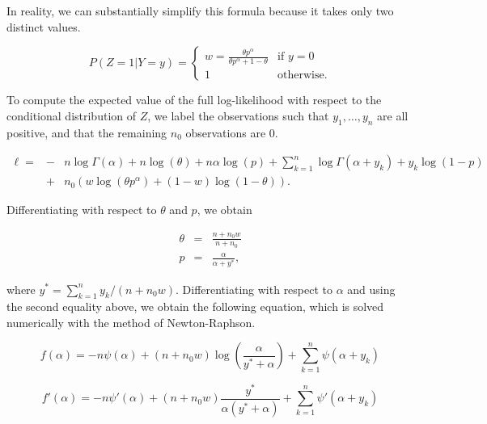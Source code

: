 \documentclass[12pt]{article}
\begin{document}
\begin{appendices}
    In reality, we can substantially simplify this formula because
    it takes only two distinct values.

    \begin{equation*}
    P(Z=1|Y=y) = \left\{
      \begin{array}{ll}
        w = \frac{\theta p^{\alpha}}{\theta p^{\alpha}+1-\theta}
        & \mbox{if } y = 0\\
        1 & \mbox{otherwise.}
      \end{array}
    \right.
    \end{equation*}

    To compute the expected value of the full log-likelihood with
    respect to the conditional distribution of $Z$, we label the
    observations such that $y_1, \ldots, y_n$ are all positive, and
    that the remaining $n_0$ observations are 0.

    \begin{eqnarray*}
      \ell = &-&n \log \Gamma(\alpha) + n\log (\theta) +
      n \alpha \log(p) +
      \sum_{k=1}^n \log \Gamma(\alpha + y_k) + y_k \log (1-p) \\
      &+& n_0 \left( w \log(\theta p^{\alpha}) +
    (1-w) \log(1-\theta) \right).
    \end{eqnarray*}

    Differentiating with respect to $\theta$ and $p$, we obtain

    \begin{eqnarray*}
      \theta &=& \frac{n+n_0w}{n+n_0} \\
      p &=& \frac{\alpha}{\alpha + y^*}, 
    \end{eqnarray*}

    \noindent
    where $y^* = \sum_{k=1}^ny_k/(n+n_0w)$.
    Differentiating with respect to $\alpha$ and using the second
    equality above, we obtain the following equation, which is solved
    numerically with the method of Newton-Raphson.

    \begin{equation}
      f(\alpha) = -n \psi(\alpha) + (n+n_0w) \log \left(\frac{\alpha}{y^*
      + \alpha} \right) + \sum_{k=1}^n \psi(\alpha + y_k)
    \end{equation}

    \begin{equation}
      f'(\alpha) = -n \psi'(\alpha) + (n+n_0w)
      \frac{y^*}{\alpha(y^*+\alpha)} + \sum_{k=1}^n \psi'(\alpha + y_k)
    \end{equation}


\end{appendices}
\end{document}
